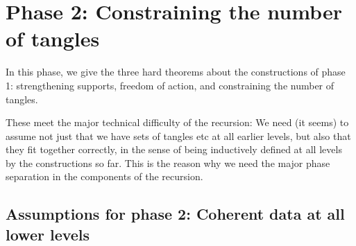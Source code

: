 \newpage

\chapter{Phase 2: Constraining the number of tangles}

In this phase, we give the three hard theorems about the constructions of phase 1: strengthening supports, freedom of action, and constraining the number of tangles.

These meet the major technical difficulty of the recursion: We need (it seems) to assume not just that we have sets of tangles etc at all earlier levels, but also that they fit together correctly, in the sense of being inductively defined at all levels by the constructions so far.  This is the reason why we need the major phase separation in the components of the recursion.

\section{Assumptions for phase 2: Coherent data at all lower levels}

